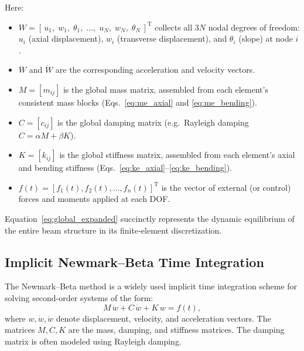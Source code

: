 \documentclass{article}
\begin{document}
	Here:
	\begin{itemize}
		\item \(W = [\,u_1,\;w_1,\;\theta_1,\;\dots,\;u_N,\;w_N,\;\theta_N\,]^\mathrm{T}\) collects all \(3N\) nodal degrees of freedom: 
		\(u_i\) (axial displacement), \(w_i\) (transverse displacement), and \(\theta_i\) (slope) at node \(i\).
		\item \(\ddot W\) and \(\dot W\) are the corresponding acceleration and velocity vectors.
		\item \(M = [m_{ij}]\) is the global mass matrix, assembled from each element’s consistent mass blocks (Eqs.~\eqref{eq:me_axial} and \eqref{eq:me_bending}).
		\item \(C = [c_{ij}]\) is the global damping matrix (e.g.\ Rayleigh damping \(C=\alpha M + \beta K\)).
		\item \(K = [k_{ij}]\) is the global stiffness matrix, assembled from each element’s axial and bending stiffness (Eqs.~\eqref{eq:ke_axial}–\eqref{eq:ke_bending}).
		\item \(f(t) = [f_1(t),f_2(t),\dots,f_n(t)]^\mathrm{T}\) is the vector of external (or control) forces and moments applied at each DOF.
	\end{itemize}
	
	Equation~\eqref{eq:global_expanded} succinctly represents the dynamic equilibrium of the entire beam structure in its finite‐element discretization.
	
		

	
	\subsection{Implicit Newmark–Beta Time Integration}

	The Newmark--Beta method is a widely used implicit time integration scheme for solving second-order systems of the form:
	\begin{equation}
		{M}\, \ddot{{w}} + {C}\, \dot{{w}} + {K}\, {w} = {f}(t),
	\end{equation}
	where \( \mathit{{w}}, \dot{\mathit{{w}}}, \ddot{\mathit{{w}}} \) denote displacement, velocity, and acceleration vectors. The matrices \( \mathit{{M}}, \mathit{{C}}, \mathit{{K}} \) are the mass, damping, and stiffness matrices. The damping matrix is often modeled using Rayleigh damping.
	
\end{document}
